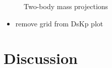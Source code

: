 \begin{figure}[!h]
\begin{subfigure}[t]{0.49\textwidth}
    \end{subfigure}
    \caption{Two-body mass projections}
    \label{fig:B2DsKK_twobodyprojections}
\end{figure}

{\color{Red}
\begin{itemize}
\item remove grid from DsKp plot 
\end{itemize}
}

\section{Discussion}
